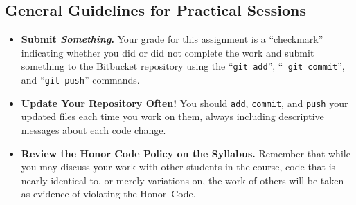           \subsection*{General Guidelines for Practical Sessions}
          \vspace*{-.05in}
          \begin{itemize}
            \item {\bf Submit \textbf{\textit{Something}}.} Your grade for this assignment is a ``checkmark'' indicating whether you
              did or did not complete the work and submit something to the Bitbucket repository using the ``{\tt git add}'', ``{\tt
              git commit}'', and ``{\tt git push}'' commands.

            \item {\bf Update Your Repository Often!} You should {\tt add}, {\tt commit}, and {\tt push} your updated files each
              time you work on them, always including descriptive messages about each code change.

            \item {\bf Review the Honor Code Policy on the Syllabus.} Remember that while you may discuss your work with other
              students in the course, code that is nearly identical to, or merely variations on, the work of others will be
              taken as evidence of violating the \mbox{Honor Code}.

          \end{itemize}
          
